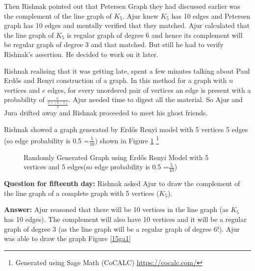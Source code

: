 Then Rishnak pointed out that Petersen Graph they had discussed earlier was the complement of the line graph of $K_5$. Ajur knew $K_5$ has 10 edges and Petersen graph has 10 edges and mentally verified that they matched. Ajur calculated that the line graph of $K_5$ is regular graph of degree 6 and hence its complement will be regular graph of degree 3 and that matched. But still he had to verify Rishnak's assertion. He decided to work on it later.

Rishnak realising that it was getting late, spent a few minutes talking about Paul Erd\H{o}s and Renyi construction of a graph. In this method for a graph with $n$ vertices and $e$ edges, for every unordered pair of vertices  an edge is present with a probability of $\frac{e}{\frac{n \times (n-1)}{2}}$. Ajur needed time to digest all the material. So Ajur and Jura drifted away and Rishnak proceeded to meet his ghost friends.

Rishnak showed a graph generated by Erd\H{o}s Renyi model with 5 vertices 5 edges (so edge probability is 0.5  =$ \frac{5}{10}$) shown in Figure \ref {17g9} \footnote{Generated using Sage Math (CoCALC) \url{https://cocalc.com/}}
\begin{figure}
\begin{center}
\caption{ Randomly Generated Graph using Erd\H{o}s Renyi Model with 5 vertices and 5 edges(so edge probability is 0.5  =$ \frac{5}{10}$)  }\label{17g9}
\end{center}
\end{figure}

\textbf{Question for fifteenth day:} Rishnak asked Ajur to draw the complement of the line graph of a complete graph with 5 vertices ($K_5$).

\textbf{Answer:} Ajur reasoned that there will be 10 vertices in the line graph (as $K_5$ has 10 edges). The complement will also have 10 vertices and it will be a regular graph of degree 3 (as the line graph will be a regular graph of degree 6!). Ajur was able to draw the graph Figure \ref{15ga1}

